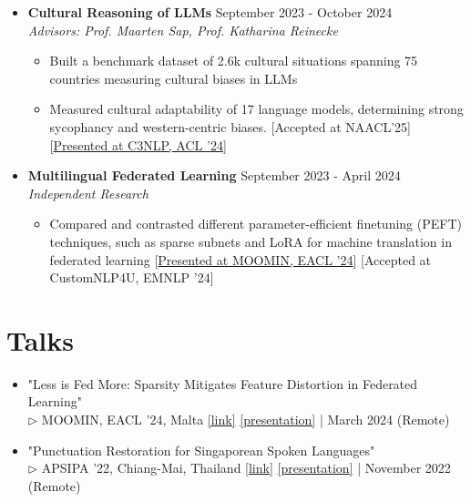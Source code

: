 \documentclass[11pt,letterpaper]{article}
\begin{document}
\begin{itemize}[leftmargin=*,label={},itemsep=6pt]
\begin{itemize}[leftmargin=*,itemsep=1pt]
        \end{itemize}
            \item \textbf{Cultural Reasoning of LLMs} \hfill September 2023 - October 2024\\
            \textit{Advisors: Prof. Maarten Sap, Prof. Katharina Reinecke}
            \begin{itemize}[leftmargin=*,itemsep=1pt]
            \item Built a benchmark dataset of 2.6k cultural situations spanning 75 countries measuring cultural biases in
                LLMs
                    \item Measured cultural adaptability of 17 language models, determining strong sycophancy and western-centric
                biases. [Accepted at NAACL'25] [\href{https://c3nlp.github.io/}{Presented at C3NLP,
                    ACL '24}]
            
        \end{itemize}
            \item \textbf{Multilingual Federated Learning} \hfill September 2023 - April 2024\\
            \textit{Independent Research}
            \begin{itemize}[leftmargin=*,itemsep=1pt]
            \item Compared and contrasted different parameter-efficient finetuning (PEFT) techniques, such as sparse
                subnets and LoRA for machine translation in federated learning [\href{https://moomin.eacl.org/}{Presented at MOOMIN, EACL '24}] [Accepted at CustomNLP4U, EMNLP '24]
            
        \end{itemize}
        \end{itemize}
    
    \section*{Talks}
    \begin{itemize}[leftmargin=*,label={},itemsep=4pt]
        \item "Less is Fed More: Sparsity Mitigates Feature Distortion in Federated Learning" \\
            $\triangleright$ MOOMIN, EACL '24, Malta  \href{https://moomin.eacl.org/}{[link]} \href{https://docs.google.com/presentation/d/1DmnfMR08y_vW9TXLn8fpqYJkntlPMDuC/edit?usp=sharing}{[presentation]} | March 2024 (Remote)    \item "Punctuation Restoration for Singaporean Spoken Languages" \\
            $\triangleright$ APSIPA '22, Chiang-Mai, Thailand  \href{https://www.apsipa.org/conference/2022/}{[link]} \href{https://docs.google.com/presentation/d/1DmnfMR08y_vW9TXLn8fpqYJkntlPMDuC/edit?usp=sharing}{[presentation]} | November 2022 (Remote)\end{itemize}
    
\end{document}
